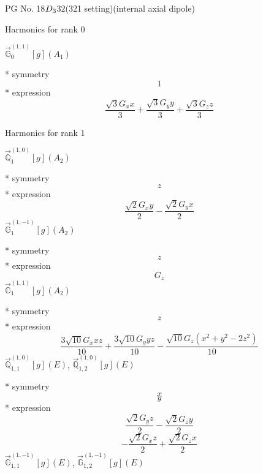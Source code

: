 \documentclass[fleqn,8pt]{jsarticle}
\begin{document}
\setcounter{MaxMatrixCols}{32}

\renewcommand{\tablename}{Table~}
\renewcommand{\figurename}{Figure~}
\begin{center}
\LARGE
PG No. 18\quad$D_{\rm 3}$\quad$32$\quad(321 setting)\quad[ trigonal ] (internal axial dipole)
\end{center}

\noindent * Harmonics for rank 0

\noindent\quad $\vec{\mathbb{G}}_{0}^{(1,1)}[g](A_{1})$

\noindent\quad ** symmetry
\begin{dmath*}
1
\end{dmath*}
\noindent\quad ** expression
\begin{dmath*}
\frac{\sqrt{3} G_{x} x}{3} + \frac{\sqrt{3} G_{y} y}{3} + \frac{\sqrt{3} G_{z} z}{3}
\end{dmath*}

\noindent * Harmonics for rank 1

\noindent\quad $\vec{\mathbb{Q}}_{1}^{(1,0)}[g](A_{2})$

\noindent\quad ** symmetry
\begin{dmath*}
z
\end{dmath*}
\noindent\quad ** expression
\begin{dmath*}
\frac{\sqrt{2} G_{x} y}{2} - \frac{\sqrt{2} G_{y} x}{2}
\end{dmath*}
\noindent\quad $\vec{\mathbb{G}}_{1}^{(1,-1)}[g](A_{2})$

\noindent\quad ** symmetry
\begin{dmath*}
z
\end{dmath*}
\noindent\quad ** expression
\begin{dmath*}
G_{z}
\end{dmath*}
\noindent\quad $\vec{\mathbb{G}}_{1}^{(1,1)}[g](A_{2})$

\noindent\quad ** symmetry
\begin{dmath*}
z
\end{dmath*}
\noindent\quad ** expression
\begin{dmath*}
\frac{3 \sqrt{10} G_{x} x z}{10} + \frac{3 \sqrt{10} G_{y} y z}{10} - \frac{\sqrt{10} G_{z} \left(x^{2} + y^{2} - 2 z^{2}\right)}{10}
\end{dmath*}
\noindent\quad $\vec{\mathbb{Q}}_{1,1}^{(1,0)}[g](E)$, $\vec{\mathbb{Q}}_{1,2}^{(1,0)}[g](E)$

\noindent\quad ** symmetry
\begin{dmath*}
x
\end{dmath*}
\begin{dmath*}
y
\end{dmath*}
\noindent\quad ** expression
\begin{dmath*}
\frac{\sqrt{2} G_{y} z}{2} - \frac{\sqrt{2} G_{z} y}{2}
\end{dmath*}
\begin{dmath*}
- \frac{\sqrt{2} G_{x} z}{2} + \frac{\sqrt{2} G_{z} x}{2}
\end{dmath*}
\noindent\quad $\vec{\mathbb{G}}_{1,1}^{(1,-1)}[g](E)$, $\vec{\mathbb{G}}_{1,2}^{(1,-1)}[g](E)$
\end{document}
